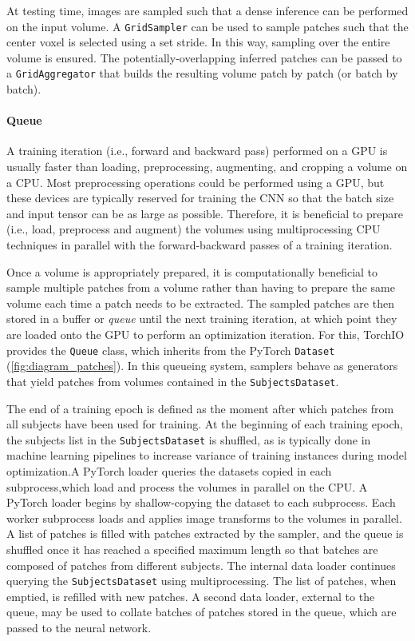 At testing time, images are sampled such that a dense inference can be performed on the input volume.
A \texttt{GridSampler} can be used to sample patches such that the center voxel is selected using a set stride.
In this way, sampling over the entire volume is ensured.
The potentially-overlapping inferred patches can be passed to a \texttt{GridAggregator} that builds the resulting volume patch by patch (or batch by batch).


\paragraph{Queue}

A training iteration (i.e., forward and backward pass) performed on a \ac{GPU} is usually faster than loading, preprocessing, augmenting, and cropping a volume on a \ac{CPU}.
Most preprocessing operations could be performed using a \ac{GPU}, but these devices are typically reserved for training the \ac{CNN} so that the batch size and input tensor can be as large as  possible.
Therefore, it is beneficial to prepare (i.e., load, preprocess and augment) the volumes using multiprocessing \ac{CPU} techniques in parallel with the forward-backward passes of a training iteration.

Once a volume is appropriately prepared, it is computationally beneficial to sample multiple patches from a volume rather than having to prepare the same volume each time a patch needs to be extracted.
The sampled patches are then stored in a buffer or \textit{queue} until the next training iteration, at which point they are loaded onto the \ac{GPU} to perform an optimization iteration.
For this, TorchIO provides the \texttt{Queue} class, which inherits from the PyTorch \texttt{Dataset} (\cref{fig:diagram_patches}).
In this queueing system, samplers behave as generators that yield patches from volumes contained in the \texttt{SubjectsDataset}.

The end of a training epoch is defined as the moment after which patches from all subjects have been used for training.
At the beginning of each training epoch, the subjects list in the \texttt{SubjectsDataset} is shuffled, as is typically done in machine learning pipelines to increase variance of training instances during model optimization.A PyTorch loader queries the datasets copied in each subprocess,which load and process the volumes in parallel on the \ac{CPU}.
A PyTorch loader begins by shallow-copying the dataset to each subprocess.
Each worker subprocess loads and applies image transforms to the volumes in parallel.
A list of patches is filled with patches extracted by the sampler, and the queue is shuffled once it has reached a specified maximum length so that batches are composed of patches from different subjects.
The internal data loader continues querying the \texttt{SubjectsDataset} using multiprocessing.
The list of patches, when emptied, is refilled with new patches.
A second data loader, external to the queue, may be used to collate batches of patches stored in the queue, which are passed to the neural network.
